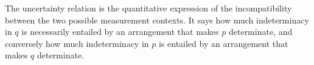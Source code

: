 The uncertainty relation is the quantitative expression of the incompatibility between the two possible measurement contexts. It says how much indeterminacy in $q$ is necessarily entailed by an arrangement that makes $p$ determinate, and conversely how much indeterminacy in $p$ is entailed by an arrangement that makes $q$ determinate. 




%



